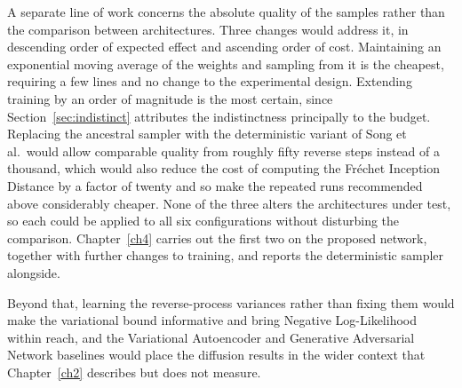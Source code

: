 A separate line of work concerns the absolute quality of the samples rather than the comparison
between architectures. Three changes would address it, in descending order of expected effect and
ascending order of cost. Maintaining an exponential moving average of the weights and sampling from
it is the cheapest, requiring a few lines and no change to the experimental design. Extending
training by an order of magnitude is the most certain, since Section~\ref{sec:indistinct} attributes
the indistinctness principally to the budget. Replacing the ancestral sampler with the deterministic
variant of Song et al.\ would allow comparable quality from roughly fifty reverse steps instead of a
thousand, which would also reduce the cost of computing the Fr\'echet Inception Distance by a factor
of twenty and so make the repeated runs recommended above considerably cheaper. None of the three
alters the architectures under test, so each could be applied to all six configurations without
disturbing the comparison. Chapter~\ref{ch4} carries out the first two on the proposed network,
together with further changes to training, and reports the deterministic sampler alongside.

Beyond that, learning the reverse-process variances rather than fixing them would make the
variational bound informative and bring Negative Log-Likelihood within reach, and the Variational
Autoencoder and Generative Adversarial Network baselines would place the diffusion results in the
wider context that Chapter~\ref{ch2} describes but does not measure.
